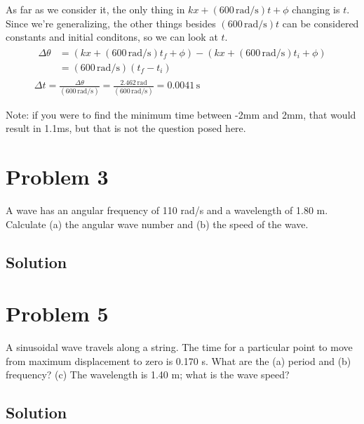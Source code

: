 \documentclass[12pt]{article}
\begin{document}
            As far as we consider it, the only thing in $kx + (600\,\unit{\radian/\second})t + \phi$ changing is $t$.
            Since we're generalizing, the other things besides $(600\,\unit{\radian/\second})t$ can be considered constants and initial conditons, so we can look at $t$.
            \begin{gather}
                \begin{align}
                    \Delta \theta &=    (kx + (600\,\unit{\radian/\second})t_f + \phi) - (kx + (600\,\unit{\radian/\second})t_i + \phi)\\
                        &=  (600\,\unit{\radian/\second}) (t_f - t_i)
                \end{align}\\
                \Delta t    =   \frac{\Delta \theta}{(600\,\unit{\radian/\second})}
                    =   \frac{2.462\,\unit{\radian}}{(600\,\unit{\radian/\second})}
                    =   \boxed{0.0041\,\unit{\second}}
            \end{gather}

            Note: if you were to find the minimum time between -2mm and 2mm, that would result in 1.1ms, but that is not the question posed here. 

    \pagebreak
    \section{Problem 3}
        A wave has an angular frequency of 110 rad/s and a wavelength of 1.80 m. 
        Calculate (a) the angular wave number and (b) the speed of the wave.

        \subsection{Solution}

    \section{Problem 5}
        A sinusoidal wave travels along a string. 
        The time for a particular point to move from maximum displacement to zero is 0.170 s.
        What are the (a) period and (b) frequency? 
        (c) The wavelength is 1.40 m; what is the wave speed?

        \subsection{Solution}
\end{document}
